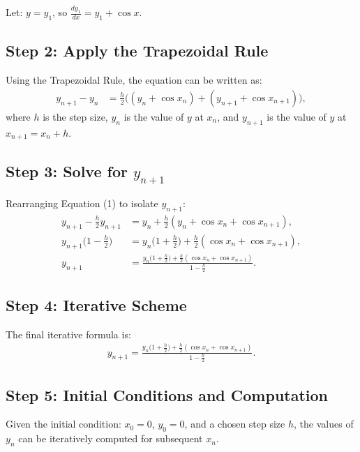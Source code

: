 \documentclass[journal]{IEEEtran}
\begin{document}
	Let:
	$y = y_1$, so $\frac{dy_1}{dx} = y_1 + \cos x$.
	
	\subsection*{Step 2: Apply the Trapezoidal Rule}
	
	Using the Trapezoidal Rule, the equation can be written as:
	\begin{align}
		y_{n+1} - y_n &= \frac{h}{2} \big( (y_n + \cos x_n) + (y_{n+1} + \cos x_{n+1}) \big),
	\end{align}
	where $h$ is the step size, $y_n$ is the value of $y$ at $x_n$, and $y_{n+1}$ is the value of $y$ at $x_{n+1} = x_n + h$.
	
	\subsection*{Step 3: Solve for $y_{n+1}$}
	
	Rearranging Equation (1) to isolate $y_{n+1}$:
	\begin{align}
		y_{n+1} - \frac{h}{2} y_{n+1} &= y_n + \frac{h}{2} (y_n + \cos x_n + \cos x_{n+1}), \\
		y_{n+1} \big( 1 - \frac{h}{2} \big) &= y_n \big( 1 + \frac{h}{2} \big) + \frac{h}{2} (\cos x_n + \cos x_{n+1}), \\
		y_{n+1} &= \frac{y_n \big( 1 + \frac{h}{2} \big) + \frac{h}{2} (\cos x_n + \cos x_{n+1})}{1 - \frac{h}{2}}.
	\end{align}
	
	\subsection*{Step 4: Iterative Scheme}
	
	The final iterative formula is:
	\begin{align}
		y_{n+1} = \frac{y_n \big( 1 + \frac{h}{2} \big) + \frac{h}{2} (\cos x_n + \cos x_{n+1})}{1 - \frac{h}{2}}.
	\end{align}
	
	\subsection*{Step 5: Initial Conditions and Computation}
	
	Given the initial condition:
	$x_0 = 0$, $y_0 = 0$,
	and a chosen step size $h$, the values of $y_n$ can be iteratively computed for subsequent $x_n$.\\
\end{document}
